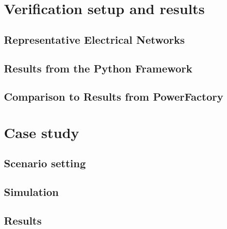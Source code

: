 

\chapter{Verification setup and results}

\section{Representative Electrical Networks}

\section{Results from the Python Framework}

\section{Comparison to Results from PowerFactory}



\chapter{Case study}

\section{Scenario setting}

\section{Simulation}

\section{Results}